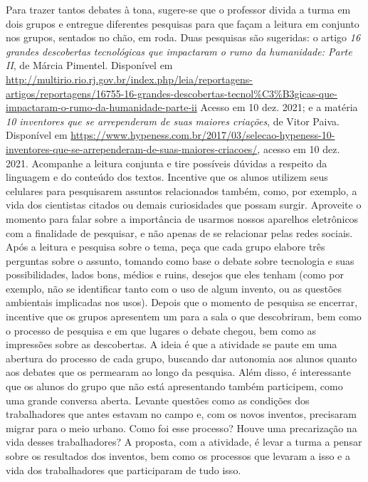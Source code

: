 \documentclass[11pt]{extarticle}
\begin{document}

Para trazer tantos debates à tona, sugere-se que o professor divida a turma em dois grupos e entregue diferentes pesquisas para que façam a leitura em conjunto nos grupos, sentados no chão, em roda. Duas pesquisas são sugeridas: o artigo \textit{16 grandes descobertas tecnológicas que impactaram o rumo da humanidade: Parte II}, de Márcia Pimentel. Disponível em \url{http://multirio.rio.rj.gov.br/index.php/leia/reportagens-artigos/reportagens/16755-16-grandes-descobertas-tecnol\%C3\%B3gicas-que-impactaram-o-rumo-da-humanidade-parte-ii} Acesso em 10 dez. 2021; e a matéria \textit{10 inventores que se arrependeram de suas maiores criações}, de Vitor Paiva. Disponível em \url{https://www.hypeness.com.br/2017/03/selecao-hypeness-10-inventores-que-se-arrependeram-de-suas-maiores-criacoes/}, acesso em 10 dez. 2021. Acompanhe a leitura conjunta e tire possíveis dúvidas a respeito da linguagem  e do conteúdo dos textos. Incentive que os alunos utilizem seus celulares para pesquisarem assuntos relacionados também, como, por exemplo, a vida dos cientistas citados ou demais curiosidades que possam surgir. Aproveite o momento para falar sobre a importância de usarmos nossos aparelhos eletrônicos com a finalidade de pesquisar, e não apenas de se relacionar pelas redes sociais. Após a leitura e pesquisa sobre o tema, peça que cada grupo elabore três perguntas sobre o assunto, tomando como base o debate sobre tecnologia e suas possibilidades, lados bons, médios e ruins, desejos que eles tenham (como por exemplo, não se identificar tanto com o uso de algum invento, ou as questões ambientais implicadas nos usos). Depois que o momento de pesquisa se encerrar, incentive que os grupos apresentem um para a sala o que descobriram, bem como o processo de pesquisa e em que lugares o debate chegou, bem como as impressões sobre as descobertas. A ideia é que a atividade se paute em uma abertura do processo de cada grupo, buscando dar autonomia aos alunos quanto aos debates que os permearam ao longo da pesquisa. Além disso, é interessante que os alunos do grupo que não está apresentando também participem, como uma grande conversa aberta. Levante questões como as condições dos trabalhadores que antes estavam no campo e, com os novos inventos, precisaram migrar para o meio urbano. Como foi esse processo? Houve uma precarização na vida desses trabalhadores? A proposta, com a atividade, é levar a turma a pensar sobre os resultados dos inventos, bem como os processos que levaram a isso e a vida dos trabalhadores que participaram de tudo isso. 
\end{document}
